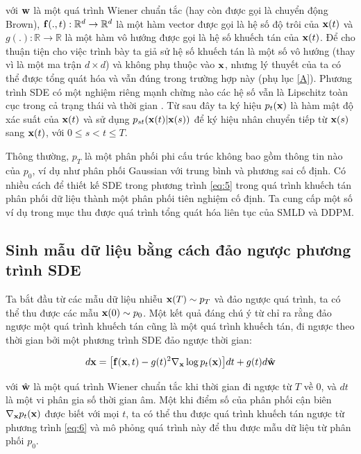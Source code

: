 \documentclass{article} %
\begin{document}
với $\bold{w}$ là một quá trình Wiener chuẩn tắc (hay còn được gọi là chuyển động Brown), $\bold{f}(.,t): \mathbb{R}^d \rightarrow \mathbb{R}^d$ là một hàm vector được gọi là hệ số độ trôi của $\bold{x}(t)$ và $g(.): \mathbb{R} \rightarrow \mathbb{R}$ là một hàm vô hướng được gọi là hệ số khuếch tán của $\bold{x}(t)$.
Để cho thuận tiện cho việc trình bày ta giả sử hệ số khuếch tán là một số vô hướng (thay vì là một ma trận $d \times d$) và không phụ thuộc vào $\bold{x}$, nhưng lý thuyết của ta có thể được tổng quát hóa và vẫn đúng trong trường hợp này (phụ lục \ref{A}).
Phương trình SDE có một nghiệm riêng mạnh chừng nào các hệ số vẫn là Lipschitz toàn cục trong cả trạng thái và thời gian \citep{oksendal2003stochastic}.
Từ sau đây ta ký hiệu $p_t (\bold{x})$ là hàm mật độ xác suất của $\bold{x}(t)$ và sử dụng $p_{st}(\bold{x}(t) \vert \bold{x}(s))$ để ký hiệu nhân chuyển tiếp từ $\bold{x}(s)$ sang $\bold{x}(t)$, với $0 \leq s < t \leq T$.

Thông thường, $p_T$ là một phân phối phi cấu trúc không bao gồm thông tin nào của $p_0$, ví dụ như phân phối Gaussian với trung bình và phương sai cố định.
Có nhiều cách để thiết kế SDE trong phương trình \ref{eq:5} trong quá trình khuếch tán phân phối dữ liệu thành một phân phối tiên nghiệm cố định.
Ta cung cấp một số ví dụ trong mục  thu được quá trình tổng quát hóa liên tục của SMLD và DDPM.

\subsection{Sinh mẫu dữ liệu bằng cách đảo ngược phương trình SDE}

Ta bắt đầu từ các mẫu dữ liệu nhiễu $\bold{x}(T) \sim p_T$ và đảo ngược quá trình, ta có thể thu được các mẫu $\bold{x}(0) \sim p_0$.
Một kết quả đáng chú ý từ \citep{anderson1982reverse} chỉ ra rằng đảo ngược một quá trình khuếch tán cũng là một quá trình khuếch tán, đi ngược theo thời gian bởi một phương trình SDE đảo ngược thời gian:

\begin{equation} \label{eq:6}
    d \bold{x} = \big \lbrack \bold{f}(\bold{x}, t) - g(t)^2 \nabla_{\bold{x}} \log p_t (\bold{x}) \big \rbrack dt + g(t) d \hat{\bold{w}}
\end{equation}

với $\hat{\bold{w}}$ là một quá trình Wiener chuẩn tắc khi thời gian đi ngược từ $T$ về $0$, và $dt$ là một vi phân gia số thời gian âm.
Một khi điểm số của phân phối cận biên $\nabla_{\bold{x}} p_t(\bold{x})$ được biết với mọi $t$, ta có thể thu được quá trình khuếch tán ngược từ phương trình \ref{eq:6} và mô phỏng quá trình này để thu được mẫu dữ liệu từ phân phối $p_0$.
\end{document}
